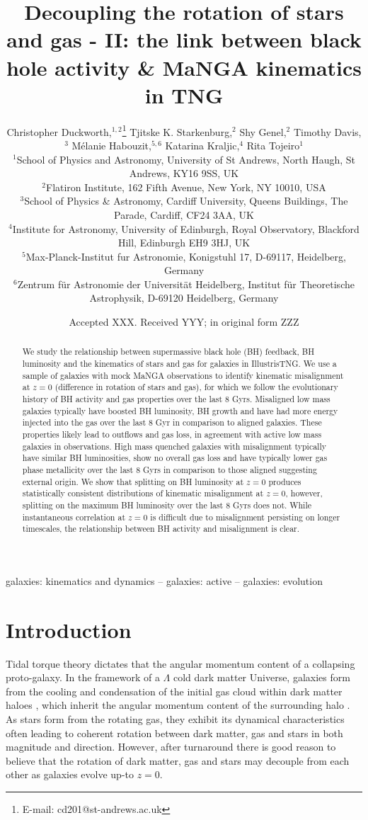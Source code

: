 \documentclass[fleqn,usenatbib]{mnras}
\title[Decoupling the rotation of stars and gas - II]{Decoupling the rotation of stars and gas - II: the link between black hole activity \& MaNGA kinematics in TNG}
\author[C. Duckworth et al.]
{Christopher Duckworth,$^{1,2}$\thanks{E-mail: cd201@st-andrews.ac.uk}
Tjitske K. Starkenburg,$^{2}$ 
Shy Genel,$^{2}$ 
Timothy Davis,$^{3}$ \newauthor
M\'elanie Habouzit,$^{5,6}$
Katarina Kraljic,$^{4}$
Rita Tojeiro$^{1}$ 
\\
$^{1}$School of Physics and Astronomy, University of St Andrews, North Haugh, St Andrews, KY16 9SS, UK\\
$^{2}$Flatiron Institute, 162 Fifth Avenue, New York, NY 10010, USA\\
$^{3}$School of Physics \& Astronomy, Cardiff University, Queens Buildings, The Parade, Cardiff, CF24 3AA, UK\\
$^{4}$Institute for Astronomy, University of Edinburgh, Royal Observatory, Blackford Hill, Edinburgh EH9 3HJ, UK\\
$^{5}$Max-Planck-Institut fur Astronomie, Konigstuhl 17, D-69117, Heidelberg, Germany\\
$^{6}$Zentrum f\"ur Astronomie der Universit\"at Heidelberg, Institut f\"ur Theoretische Astrophysik, D-69120 Heidelberg, Germany\\
}
\date{Accepted XXX. Received YYY; in original form ZZZ}
\begin{document}
\label{firstpage}
\pagerange{\pageref{firstpage}--\pageref{lastpage}}
\maketitle

\begin{abstract}
We study the relationship between supermassive black hole (BH) feedback, BH luminosity and the kinematics of stars and gas for galaxies in IllustrisTNG. We use a sample of galaxies with mock MaNGA observations to identify kinematic misalignment at $z=0$ (difference in rotation of stars and gas), for which we follow the evolutionary history of BH activity and gas properties over the last 8 Gyrs. Misaligned low mass galaxies typically have boosted BH luminosity, BH growth and have had more energy injected into the gas over the last 8 Gyr in comparison to aligned galaxies. These properties likely lead to outflows and gas loss, in agreement with active low mass galaxies in observations. High mass quenched galaxies with misalignment typically have similar BH luminosities, show no overall gas loss and have typically lower gas phase metallicity over the last 8 Gyrs in comparison to those aligned suggesting external origin. We show that splitting on BH luminosity at $z=0$ produces statistically consistent distributions of kinematic misalignment at $z=0$, however, splitting on the maximum BH luminosity over the last 8 Gyrs does not. While instantaneous correlation at $z=0$ is difficult due to misalignment persisting on longer timescales, the relationship between BH activity and misalignment is clear.
\end{abstract}

\begin{keywords}
galaxies: kinematics and dynamics -- galaxies: active -- galaxies: evolution
\end{keywords}



\section{Introduction}
Tidal torque theory \citep[e.g.][]{peebles1969, Doroshkevich1970} dictates that the angular momentum content of a collapsing proto-galaxy. In the framework of a $\Lambda$ cold dark matter Universe, galaxies form from the cooling and condensation of the initial gas cloud within dark matter haloes \citep{mo1998}, which inherit the angular momentum content of the surrounding halo \citep[][]{white1978, fall1980}. As stars form from the rotating gas, they exhibit its dynamical characteristics often leading to coherent rotation between dark matter, gas and stars in both magnitude and direction. However, after turnaround there is good reason to believe that the rotation of dark matter, gas and stars may decouple from each other as galaxies evolve up-to $z=0$. 
\end{document}
